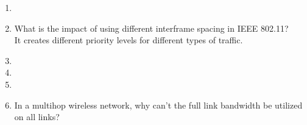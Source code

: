 \documentclass[10pt, a4paper]{article}
\begin{document}
\begin{enumerate}
\item\mbox{}
\item\mbox{}What is the impact of using different interframe spacing in IEEE 802.11?\\
    \color{blue}
    It creates different priority levels for different types of traffic.
    \color{black}
\item\mbox{}
\item\mbox{}
\item\mbox{}
\item\mbox{} In a multihop wireless network, why can't the full link bandwidth be utilized on all links?\\
    \color{blue}
\end{enumerate}
\end{document}
